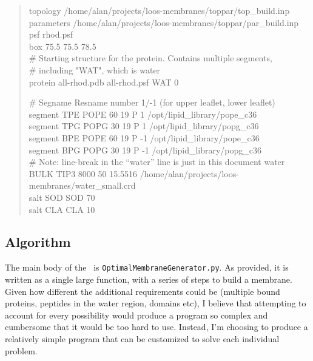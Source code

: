 \documentclass[12pt]{article}
\begin{document}
\begin{quote}
topology /home/alan/projects/loos-membranes/toppar/top\_build.inp \\
parameters /home/alan/projects/loos-membranes/toppar/par\_build.inp \\
psf      rhod.psf \\
box      75.5  75.5  78.5 \\

\# Starting structure for the protein.  Contains multiple segments, \\
\# including "WAT", which is water \\
protein  all-rhod.pdb all-rhod.psf WAT 0

\# Segname  Resname number 1/-1 (for upper leaflet, lower leaflet) \\
segment TPE   POPE     60    19    P 1      /opt/lipid\_library/pope\_c36 \\
segment TPG   POPG     30    19    P 1      /opt/lipid\_library/popg\_c36 \\
segment BPE   POPE     60    19   P  -1     /opt/lipid\_library/pope\_c36 \\
segment BPG   POPG     30    19   P  -1     /opt/lipid\_library/popg\_c36 \\

\# Note: line-break in the ``water'' line is just in this document
water   BULK     TIP3      8000       50      15.5516 /home/alan/projects/loos-membranes/water\_small.crd \\
salt    SOD       SOD      70 \\
salt    CLA       CLA      10 \\

\end{quote}

\subsection{Algorithm}
\label{ss:algorithm}

The main body of the \omgwtf\ is {\tt OptimalMembraneGenerator.py}.  As
provided, it is written as a single large function, with a series of steps to
build a membrane.  Given how different the additional requirements could be
(multiple bound proteins, peptides in the water region, domains
etc),  I believe that attempting to account for every possibility would
produce a program so complex and cumbersome that it would be too hard to use.
Instead, I'm choosing to produce a relatively simple program that can be
customized to solve each individual problem.
\end{document}

